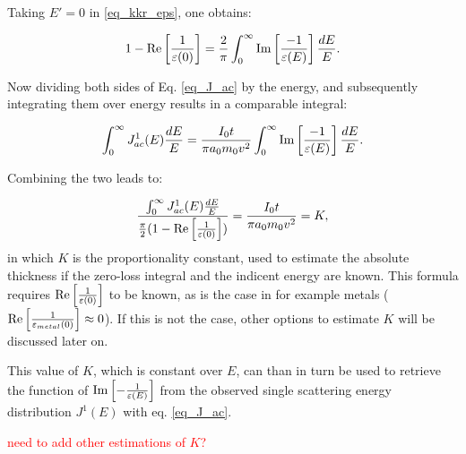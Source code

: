 \documentclass[12pt,a4paper]{article}
\def\frac#1#2{{{#1}\over {#2}}}
\numberwithin{equation}{section}
\numberwithin{figure}{section}
\numberwithin{table}{section}
\begin{document}
Taking $E' = 0$ in \eqref{eq_kkr_eps}, one obtains:

\begin{equation}
    1-\operatorname{Re}\left[\frac{1}{\varepsilon(0)}\right]=\frac{2}{\pi} \int_{0}^{\infty} \operatorname{Im}\left[\frac{-1}{\varepsilon(E)}\right] \frac{d E}{E}.
\end{equation}

Now dividing both sides of Eq. \eqref{eq_J_ac} by the energy, and subsequently integrating them over energy results in a comparable integral:

\begin{equation}\label{eq_J_ac}
    \int_{0}^{\infty} J^1_{ac}(E) \frac{d E}{E}=  \frac{I_{0} t}{\pi a_{0} m_{0} v^{2}}  \int_{0}^{\infty} \operatorname{Im}\left[\frac{-1}{\varepsilon(E)}\right]   \frac{d E}{E} .
\end{equation}

Combining the two leads to:

\begin{equation}
    \frac{\int_{0}^{\infty} J^1_{ac}(E) \frac{d E}{E}}{\frac{\pi}{2}(1-\operatorname{Re}\left[\frac{1}{\varepsilon(0)}\right])} = \frac{I_{0} t}{\pi a_{0} m_{0} v^{2}} = K ,
\end{equation}
in which $K$ is the proportionality constant, used to estimate the absolute thickness if the zero-loss integral and the indicent energy are known. This formula requires $\operatorname{Re}\left[\frac{1}{\varepsilon(0)}\right]$ to be known, as is the case in for example metals ($\operatorname{Re}\left[\frac{1}{\varepsilon_{metal}(0)}\right]\approx 0$). If this is not the case, other options to estimate $K$ will be discussed later on.

This value of $K$, which is constant over $E$, can than in turn be used to retrieve the function of $\operatorname{Im}\left[-\frac{1}{\varepsilon(E)}\right]$ from the observed single scattering energy distribution $J^1(E)$ with eq. \eqref{eq_J_ac}.

\textcolor{red}{need to add other estimations of $K$?}
\end{document}
